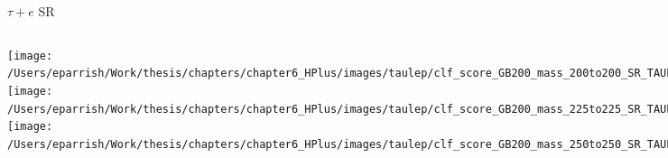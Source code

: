 \documentclass[aspectratio=169,xcolor=table]{beamer}
\begin{document}
    \begin{frame}[t]{$\tau+e$ SR}
      \begin{columns}[t]
          \texttt{[image: /Users/eparrish/Work/thesis/chapters/chapter6\_HPlus/images/taulep/clf\_score\_GB200\_mass\_200to200\_SR\_TAUEL.png]}
          \texttt{[image: /Users/eparrish/Work/thesis/chapters/chapter6\_HPlus/images/taulep/clf\_score\_GB200\_mass\_225to225\_SR\_TAUEL.png]}
          \texttt{[image: /Users/eparrish/Work/thesis/chapters/chapter6\_HPlus/images/taulep/clf\_score\_GB200\_mass\_250to250\_SR\_TAUEL.png]}

          \texttt{[image: /Users/eparrish/Work/thesis/chapters/chapter6\_HPlus/images/taulep/clf\_score\_GB200\_mass\_275to275\_SR\_TAUEL.png]}
          \texttt{[image: /Users/eparrish/Work/thesis/chapters/chapter6\_HPlus/images/taulep/clf\_score\_GB200\_mass\_300to300\_SR\_TAUEL.png]}
          \texttt{[image: /Users/eparrish/Work/thesis/chapters/chapter6\_HPlus/images/taulep/clf\_score\_GB200\_mass\_350to350\_SR\_TAUEL.png]}

          \texttt{[image: /Users/eparrish/Work/thesis/chapters/chapter6\_HPlus/images/taulep/clf\_score\_GB200\_mass\_400to400\_SR\_TAUEL.png]}
          \texttt{[image: /Users/eparrish/Work/thesis/chapters/chapter6\_HPlus/images/taulep/clf\_score\_GB200\_mass\_500to500\_SR\_TAUEL.png]}
          \texttt{[image: /Users/eparrish/Work/thesis/chapters/chapter6\_HPlus/images/taulep/clf\_score\_GB200\_mass\_600to600\_SR\_TAUEL.png]}

          \texttt{[image: /Users/eparrish/Work/thesis/chapters/chapter6\_HPlus/images/taulep/clf\_score\_GB200\_mass\_700to700\_SR\_TAUEL.png]}
          \texttt{[image: /Users/eparrish/Work/thesis/chapters/chapter6\_HPlus/images/taulep/clf\_score\_GB200\_mass\_800to800\_SR\_TAUEL.png]}
          \texttt{[image: /Users/eparrish/Work/thesis/chapters/chapter6\_HPlus/images/taulep/clf\_score\_GB200\_mass\_900to900\_SR\_TAUEL.png]}

      \end{columns}
    \end{frame}
\end{document}

